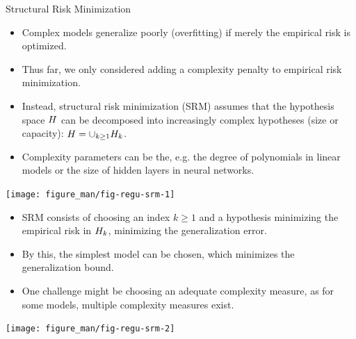 \begin{vbframe} {Structural Risk Minimization}

\begin{itemize}
  \item Complex models generalize poorly (overfitting) if merely the empirical risk is optimized. 
  \item Thus far, we only considered adding a complexity penalty to empirical risk minimization. 
  \item Instead,  structural risk minimization (SRM) assumes that the hypothesis space $H$ can be decomposed into increasingly complex hypotheses (size or capacity): $H = \cup_{k \geq 1 }H_{k}$. 
  \item Complexity parameters can be the, e.g. the degree of polynomials in linear models or the size of hidden layers in neural networks.  
\end{itemize}

\begin{center}
\texttt{[image: figure\_man/fig-regu-srm-1]}
\end{center}

\framebreak


\begin{itemize}

  \item SRM consists of choosing an index $k \geq 1$  and a hypothesis minimizing the empirical risk in $H_k$, minimizing the generalization error.
  \item By this, the simplest model can be chosen, which minimizes the generalization bound.  
  \item One challenge might be choosing an adequate complexity measure, as for some models, multiple complexity measures exist.
\end{itemize}

\begin{center}
\texttt{[image: figure\_man/fig-regu-srm-2]}
\end{center}

\end{vbframe}

